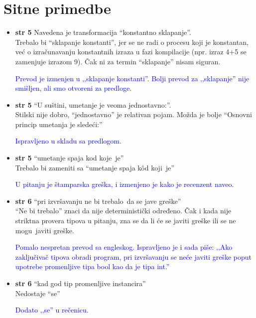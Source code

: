\documentclass[a4paper]{report}
\newcommand{\odgovor}[1]{\textcolor{blue}{#1}}
\begin{document}
\section{Sitne primedbe}
\begin{itemize}
\item \textbf{str 5} Navedena je transformacija ``konstantno sklapanje''.\\Trebalo bi ``sklapanje konstanti'', jer se ne radi o procesu koji je konstantan, već o izračunavanju konstantnih izraza u fazi kompilacije (npr. izraz 4+5 se zamenjuje izrazom 9). Čak ni za termin ``sklapanje'' nisam siguran.

\odgovor{Prevod je izmenjen u ‚‚sklapanje konstanti''. Bolji prevod za ‚‚sklapanje'' nije smišljen, ali smo otvoreni za predloge.}

\item \textbf{str 5} ``U suštini, umetanje je veoma jednostavno:''.\\ Stilski nije dobro, ``jednostavno'' je relativan pojam. Možda je bolje ``Osnovni princip umetanja je sledeći:''

\odgovor{Ispravljeno u skladu sa predlogom.}

\item \textbf{str 5} ``umetanje spaja \color{blue}kod koje\color{black}~je''\\ Trebalo bi zameniti sa ``umetanje spaja \color{blue}kôd koji\color{black}~je''

\odgovor{U pitanju je štamparska greška, i izmenjeno je kako je recenzent naveo.}

\item \textbf{str 6} ``pri izvršavanju \color{blue}ne bi trebalo\color{black}~da se jave greške'' \\ ``Ne bi trebalo'' znaci da nije deterministički određeno. Čak i kada nije striktna provera tipova u pitanju, zna se da li će se javiti greške ili se \color{blue}ne mogu\color{black}~javiti greške.

\odgovor{Pomalo nespretan prevod sa engleskog. Ispravljeno je i sada piše: ‚‚Ako zaključivač tipova obradi program, pri izvršavanju se neće javiti greške poput upotrebe promenljive tipa bool kao da je tipa int.''}


\item \textbf{str 6} ``kad god tip promenljive instancira'' \\ Nedostaje ``se''

\odgovor{Dodato ‚‚se'' u rečenicu.}


\end{itemize}
\end{document}
